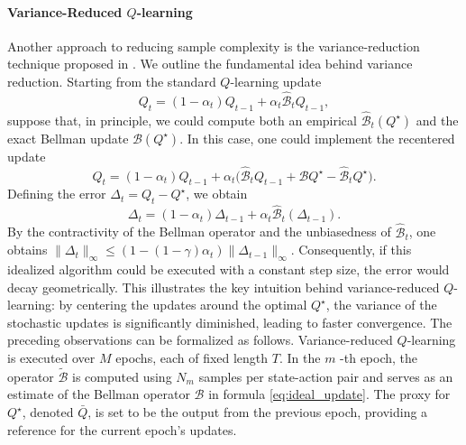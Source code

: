 \documentclass{article}
\numberwithin{equation}{section}
\begin{document}
\paragraph{Variance-Reduced $Q$-learning} 
Another approach to reducing sample complexity is the variance-reduction technique proposed in \cite{wainwright2019variance}. We outline the fundamental idea behind variance reduction. Starting from the standard $Q$-learning update
\begin{equation}
    Q_t = (1-\alpha_t) Q_{t-1} + \alpha_t \widehat{\mathcal{B}}_t Q_{t-1},
\end{equation}
suppose that, in principle, we could compute both an empirical \(\widehat{\mathcal{B}}_t(Q^\star)\) and the exact Bellman update \(\mathcal{B}(Q^\star)\). In this case, one could implement the recentered update
\begin{equation}\label{eq:ideal_update}
    Q_t = (1-\alpha_t) Q_{t-1} + \alpha_t \Big(\widehat{\mathcal{B}}_t Q_{t-1} + \mathcal{B} Q^\star - \widehat{\mathcal{B}}_t Q^\star \Big).
\end{equation}
Defining the error \(\Delta_t = Q_t - Q^\star\), we obtain
\begin{equation}
    \Delta_t = (1-\alpha_t) \Delta_{t-1} + \alpha_t \widehat{\mathcal{B}}_t( \Delta_{t-1}) .
\end{equation}
By the contractivity of the Bellman operator and the unbiasedness of $\widehat{\mathcal B}_t$, one obtains \(\|\Delta_t\|_{\infty} \leq (1 - (1-\gamma)\alpha_t)\|\Delta_{t-1}\|_{\infty}\). Consequently, if this idealized algorithm could be executed with a constant step size, the error would decay geometrically. This illustrates the key intuition behind variance-reduced $Q$-learning: by centering the updates around the optimal $Q^\star$, the variance of the stochastic updates is significantly diminished, leading to faster convergence. The preceding observations can be formalized as follows. Variance-reduced $Q$-learning is executed over $M$ epochs, each of fixed length $T$. In the $m$ -th epoch, the operator \(\widetilde{\mathcal{B}}\) is computed using \(N_m\) samples per state-action pair and serves as an estimate of the Bellman operator $\mathcal{B}$ in formula \eqref{eq:ideal_update}.
The proxy for $Q^\star$, denoted $\bar{Q}$, is set to be the output from the previous epoch, providing a reference for the current epoch's updates.
 
\end{document}
